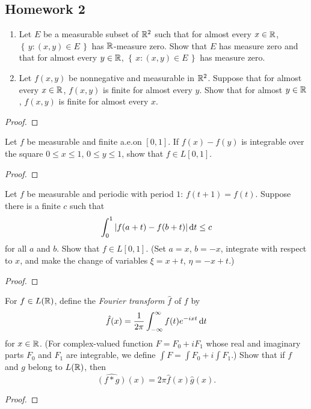 \subsection{Homework 2}
\begin{problem}
\begin{enumerate}[label=(\alph*)]
\item Let $E$ be a measurable subset of $\mathbb{R}^2$ such that for almost every
  $x\in\mathbb{R}$, $\left\{\,y:(x,y)\in E\,\right\}$ has
  $\mathbb{R}$-measure zero. Show that $E$ has measure zero and that for almost
  every $y\in\mathbb{R}$, $\left\{\,x:(x,y)\in E\,\right\}$ has
  measure zero.
\item Let $f(x,y)$ be nonnegative and measurable in $\mathbb{R}^2$. Suppose that
  for almost every $x\in\mathbb{R}$, $f(x,y)$ is finite for almost every
  $y$. Show that for almost $y\in\mathbb{R}$, $f(x,y)$ is finite for almost
  every $x$.
\end{enumerate}
\end{problem}
\begin{proof}
\end{proof}

\begin{problem}
Let $f$ be measurable and finite a.e.\@ on $[0,1]$. If $f(x)-f(y)$ is
integrable over the square $0\leq x\leq 1$, $0\leq y\leq 1$, show that
$f\in L[0,1]$.
\end{problem}
\begin{proof}
\end{proof}

\begin{problem}
Let $f$ be measurable and periodic with period $1$: $f(t+1)=f(t)$. Suppose
there is a finite $c$ such that
\[
\int_0^1|f(a+t)-f(b+t)|\mathop{}\!\mathrm{d} t\leq c
\]
for all $a$ and $b$. Show that $f\in L[0,1]$. (Set $a=x$, $b=-x$, integrate
with respect to $x$, and make the change of variables $\xi=x+t$,
$\eta=-x+t$.)
\end{problem}
\begin{proof}
\end{proof}

\begin{problem}
For $f\in L(\mathbb{R})$, define the \emph{Fourier transform $\hat f$} of $f$
by
\[
\hat f(x)=\frac{1}{2\pi}\int_{-\infty}^\infty f(t)e^{-ixt}\mathop{}\!\mathrm{d} t
\]
for $x\in\mathbb{R}$. (For complex-valued function $F=F_0+iF_1$ whose real and
imaginary parts $F_0$ and $F_1$ are integrable, we define $\int F=\int
F_0+i\int F_1$.) Show that if $f$ and $g$ belong to $L(\mathbb{R})$, then
\[
\widehat{(f*g)}(x)=2\pi\hat f(x)\hat g(x).
\]
\end{problem}
\begin{proof}
\end{proof}

